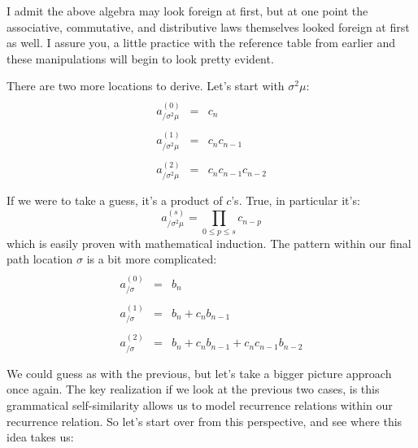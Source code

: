 \documentclass[twoside]{article}
\begin{document}
I admit the above algebra may look foreign at first, but at one point the associative, commutative, and distributive
laws themselves looked foreign at first as well. I assure you, a little practice with the reference table from earlier
and these manipulations will begin to look pretty evident.

There are two more locations to derive. Let's start with $ \sigma^2\mu $:
$$ \begin{array}{rcl}
							\\
a^{(0)}_{/\sigma^2\mu}	& = & c_n			\\
							\\
a^{(1)}_{/\sigma^2\mu}	& = & c_nc_{n-1}	 	\\
							\\
a^{(2)}_{/\sigma^2\mu}	& = & c_nc_{n-1}c_{n-2}		\\
							\\
\end{array} $$
If we were to take a guess, it's a product of $ c $'s. True, in particular it's:
$$ a^{(s)}_{/\sigma^2\mu}=\prod_{0\le p\le s}c_{n-p} $$
which is easily proven with mathematical induction. The pattern within our final path location $ \sigma $ is a bit more complicated:
$$ \begin{array}{rcl}
									\\
a^{(0)}_{/\sigma}	& = & b_n					\\
									\\
a^{(1)}_{/\sigma}	& = & b_n+c_nb_{n-1}				\\
									\\
a^{(2)}_{/\sigma}	& = & b_n+c_nb_{n-1}+c_nc_{n-1}b_{n-2}		\\
									\\
\end{array} $$
We could guess as with the previous, but let's take a bigger picture approach once again. The key realization if we look
at the previous two cases, is this grammatical self-similarity allows us to model recurrence relations within our recurrence
relation. So let's start over from this perspective, and see where this idea takes us:
\end{document}
